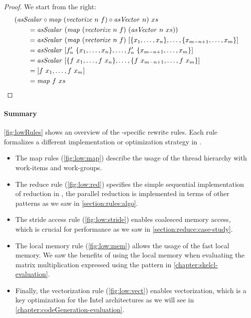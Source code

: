 \begin{proof}
  We start from the right:
  \begin{align*}
    &(\asScalar \circ \map\ (\vect\ n\ f) \circ \asVector\ n)\ xs\\
    &\qquad = \asScalar\ (\map\ (\vect\ n\ f)\ (\asVector\ n\ xs))\\
    &\qquad = \asScalar\ (\map\ (\vect\ n\ f)\ [\{x_1, \ldots, x_n\}, \ldots ,\{x_{m-n+1}, \ldots, x_m\}]\\
    &\qquad = \asScalar\ [f'_n\ \{x_1, \ldots, x_n\}, \ldots ,f'_n\ \{x_{m-n+1}, \ldots, x_m\}]\\
    &\qquad = \asScalar\ [\{f\ x_1, \ldots, f\ x_n\}, \ldots ,\{f\ x_{m-n+1}, \ldots, f\ x_m\}]\\
    &\qquad = [f\ x_1, \ldots, f\ x_m]\\
    &\qquad = \map\ f\ xs
  \end{align*}
\end{proof}

\paragraph{Summary}
\autoref{fig:lowRules} shows an overview of the \OpenCL-specific rewrite rules.
Each rule formalizes a different implementation or optimization strategy in \OpenCL.

\begin{itemize}
  \item The map rules (\autoref{fig:low:map}) describe the usage of the \OpenCL thread hierarchy with work-items and work-groups.

  \item The reduce rule (\autoref{fig:low:red}) specifies the simple sequential implementation of reduction in \OpenCL, the parallel reduction is implemented in terms of other patterns as we saw in \autoref{section:rules:algo}.

  \item The stride access rule (\autoref{fig:low:stride}) enables coalesced memory access, which is crucial for performance as we saw in \autoref{section:reduce:case-study}.

  \item The local memory rule (\autoref{fig:low:mem}) allows the usage of the fast local memory.
  We saw the benefits of using the local memory when evaluating the matrix multiplication expressed using the \allpairs pattern in \autoref{chapter:skelcl-evaluation}.

  \item Finally, the vectorization rule (\autoref{fig:low:vect}) enables vectorization, which is a key optimization for the Intel \CPU architectures as we will see in \autoref{chapter:codeGeneration-evaluation}.
\end{itemize}

